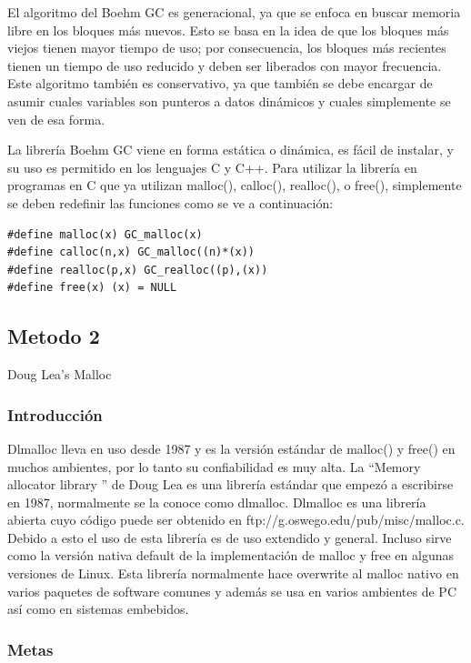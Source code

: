 \documentclass[11pt]{article} %
\begin{document}
	El algoritmo del Boehm GC es generacional, ya que se enfoca en buscar memoria libre en los bloques más nuevos. Esto se basa en la idea de que los bloques más viejos tienen mayor tiempo de uso; por consecuencia, los bloques más recientes tienen un tiempo de uso reducido y deben ser liberados con mayor frecuencia. Este algoritmo también es conservativo, ya que también se debe encargar de asumir cuales variables son punteros a datos dinámicos y cuales simplemente se ven de esa forma.

	La librería Boehm GC viene en forma estática o dinámica, es fácil de instalar, y su uso es permitido en los lenguajes C y C++. Para utilizar la librería en programas en C que ya utilizan malloc(), calloc(), realloc(), o free(), simplemente se deben redefinir las funciones como se ve a continuación:
\lstset{language=C}          %

\begin{lstlisting}[frame=single]  % Start your code-block
#define malloc(x) GC_malloc(x)
#define calloc(n,x) GC_malloc((n)*(x))
#define realloc(p,x) GC_realloc((p),(x))
#define free(x) (x) = NULL
\end{lstlisting}

\subsection{Metodo 2}
 Doug Lea's Malloc
\subsubsection{Introducción}
Dlmalloc lleva en uso desde 1987 y es la versión estándar de malloc() y free() en muchos ambientes, por lo tanto su confiabilidad es muy alta.
La “Memory allocator library  ” de Doug Lea es una librería estándar que empezó a escribirse en 1987, normalmente se la conoce como dlmalloc.
Dlmalloc es una librería abierta cuyo código puede ser obtenido en ftp://g.oswego.edu/pub/misc/malloc.c. 
Debido a esto el uso de esta librería es de uso extendido y general. Incluso sirve como la versión nativa default de la implementación de malloc y free en algunas versiones de Linux. Esta librería normalmente hace overwrite al malloc nativo en varios paquetes de software comunes y además se usa en varios ambientes de PC así como en sistemas embebidos. 
\subsubsection{Metas}
\end{document}
